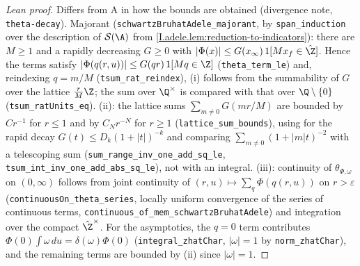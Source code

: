 \begin{proof}[Lean proof]
Differs from A in how the bounds are obtained (divergence note, \texttt{theta-decay}). Majorant (\texttt{schwartzBruhatAdele\_majorant}, by \texttt{span\_induction} over the description of $\mathcal S(\A)$ from \cref{I.adele.lem:reduction-to-indicators}): there are $M\ge1$ and a rapidly decreasing $G\ge0$ with $|\Phi(x)|\le G(x_\infty)\,1[Mx_f\in\hat\Z]$. Hence the terms satisfy $|\Phi(q(r,u))|\le G(qr)\,1[Mq\in\Z]$ (\texttt{theta\_term\_le}) and, reindexing $q=m/M$ (\texttt{tsum\_rat\_reindex}), (i) follows from the summability of $G$ over the lattice $\frac rM\Z$; the sum over $\Q^\times$ is compared with that over $\Q\setminus\{0\}$ (\texttt{tsum\_ratUnits\_eq}). (ii): the lattice sums $\sum_{m\ne0}G(mr/M)$ are bounded by $Cr^{-1}$ for $r\le1$ and by $C_Nr^{-N}$ for $r\ge1$ (\texttt{lattice\_sum\_bounds}), using for the rapid decay $G(t)\le D_k(1+|t|)^{-k}$ and comparing $\sum_{m\ne0}(1+|m|t)^{-2}$ with a telescoping sum (\texttt{sum\_range\_inv\_one\_add\_sq\_le}, \texttt{tsum\_int\_inv\_one\_add\_abs\_sq\_le}), not with an integral. (iii): continuity of $\theta_{\Phi,\omega}$ on $(0,\infty)$ follows from joint continuity of $(r,u)\mapsto\sum_q\Phi(q(r,u))$ on $r>\varepsilon$ (\texttt{continuousOn\_theta\_series}, locally uniform convergence of the series of continuous terms, \texttt{continuous\_of\_mem\_schwartzBruhatAdele}) and integration over the compact $\hat\Z^\times$. For the asymptotics, the $q=0$ term contributes $\Phi(0)\int\omega\,du=\delta(\omega)\Phi(0)$ (\texttt{integral\_zhatChar}, $|\omega|=1$ by \texttt{norm\_zhatChar}), and the remaining terms are bounded by (ii) since $|\omega|=1$.
\end{proof}

